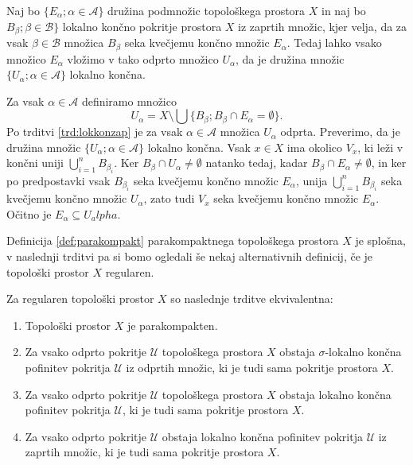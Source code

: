 \documentclass[mat1]{fmfdelo}
\begin{document}
\begin{trditev}\label{trd:lokkonvlozitev}
Naj bo $\lbrace E_\alpha ; \alpha \in \mathcal{A} \rbrace$ družina podmnožic topološkega prostora $X$ in naj bo $B_\beta ; \beta \in \mathcal{B} \rbrace$ lokalno končno pokritje prostora $X$ iz zaprtih množic, kjer velja, da za vsak $\beta \in \mathcal{B}$ množica $B_\beta$ seka kvečjemu končno množic $E_\alpha$. Tedaj lahko vsako množico $E_\alpha$ vložimo v tako odprto množico $U_\alpha$, da je družina množic $\lbrace U_\alpha ; \alpha \in \mathcal{A} \rbrace$ lokalno končna.
\end{trditev}

\begin{dokaz}
Za vsak $\alpha \in \mathcal{A}$ definiramo množico
\[ U_\alpha = X \setminus \bigcup\lbrace B_\beta ; B_\beta \cap E_\alpha = \emptyset\rbrace. \]
Po trditvi \ref{trd:lokkonzap} je za vsak $\alpha \in \mathcal{A}$ množica $U_\alpha$ odprta. Preverimo, da je družina množic $\lbrace U_\alpha ; \alpha \in \mathcal{A} \rbrace$ lokalno končna. Vsak $x \in X$ ima okolico $V_x$, ki leži v končni uniji $\bigcup_{i = 1}^n B_{\beta_i}$. Ker $B_\beta \cap U_\alpha \neq \emptyset$ natanko tedaj, kadar $B_\beta \cap E_\alpha \neq \emptyset$, in ker po predpostavki vsak $B_{\beta_i}$ seka kvečjemu končno množic $E_\alpha$, unija $\bigcup_{i = 1}^n B_{\beta_i}$ seka kvečjemu končno množic $U_\alpha$, zato tudi $V_x$ seka kvečjemu končno množic $E_\alpha$. Očitno je $E_\alpha \subseteq U_alpha$.
\end{dokaz}

Definicija \ref{def:parakompakt} parakompaktnega topološkega prostora $X$ je splošna, v naslednji trditvi pa si bomo ogledali še nekaj alternativnih definicij, če je topološki prostor $X$ regularen.

\begin{trditev}\label{trd:parakompkar}
Za regularen topološki prostor $X$ so naslednje trditve ekvivalentna:
\begin{enumerate}
\item Topološki prostor $X$ je parakompakten.\label{podtrd:parakompkar1}
\item Za vsako odprto pokritje $\mathcal{U}$ topološkega prostora $X$ obstaja $\sigma$-lokalno končna pofinitev pokritja $\mathcal{U}$ iz odprtih množic, ki je tudi sama pokritje prostora $X$.\label{podtrd:parakompkar2}
\item Za vsako odprto pokritje $\mathcal{U}$ topološkega prostora $X$ obstaja lokalno končna pofinitev pokritja $\mathcal{U}$, ki je tudi sama pokritje prostora $X$.\label{podtrd:parakompkar3}
\item Za vsako odprto pokritje $\mathcal{U}$ obstaja lokalno končna pofinitev pokritja $\mathcal{U}$ iz zaprtih množic, ki je tudi sama pokritje prostora $X$.\label{podtrd:parakompkar4}
\end{enumerate}
\end{trditev}
\end{document}
